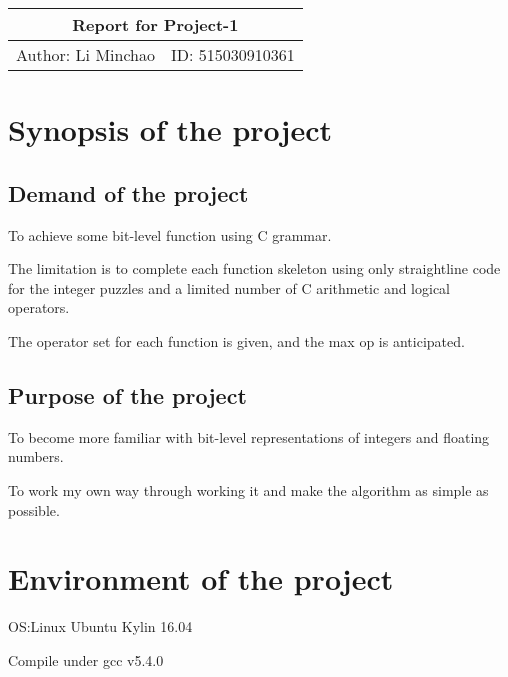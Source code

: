\documentclass[12pt,a4paper]{article}
\theoremstyle{definition}
\numberwithin{equation}{section}
\numberwithin{figure}{section}
\begin{document}
\begin{spacing}{1.5}
\begin{center}
\begin{spacing}{3.0}
\begin{tabular}{c c}
\multicolumn{2}{c}{\Huge{Report for Project-1 \hspace{2cm}}} \\
\hline
\large{Author: Li Minchao} & \large {ID: 515030910361}\\
\end{tabular}
\end{spacing}
\end{center}
\section{Synopsis of the project}\par
\subsection{Demand of the project}
To achieve some bit-level function using C grammar.\par
The limitation is to complete each function skeleton using only straightline code for the integer puzzles and a limited number of C arithmetic and logical operators.\par
The operator set for each function is given, and the max op is anticipated.\par
\subsection{Purpose of the project}
To become more familiar with bit-level representations of integers and floating numbers.\par
To work my own way through working it and make the algorithm as simple as possible.\par
\section{Environment of the project}
OS:Linux Ubuntu Kylin 16.04\par
Compile under gcc v5.4.0\par

\end{spacing}
\end{document}
